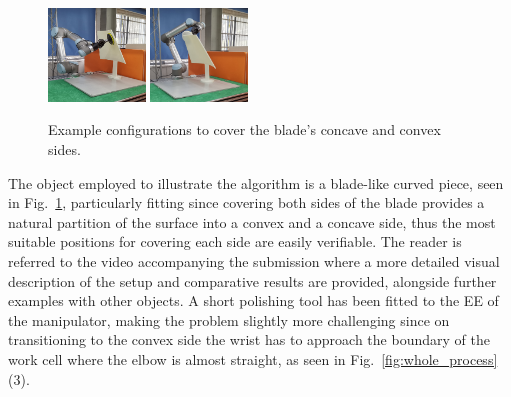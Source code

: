 \documentclass[letterpaper, 10pt, conference]{ieeeconf}
\begin{document}
\begin{figure}[t]
\centering
\includegraphics[width = 0.23\textwidth]{figures/real_world/concave_blade_2}
\includegraphics[width = 0.23\textwidth]{figures/real_world/convex_blade_2}
\caption{Example configurations to cover the blade's concave and convex sides. }
\label{fig:real_world}
\vspace{-0.5cm}
\end{figure}


The object employed to illustrate the algorithm is a blade-like curved piece, seen in Fig.~\ref{fig:real_world}, particularly fitting since covering both sides of the blade provides a natural partition of the surface into a convex and a concave side, thus the most suitable positions for covering each side are easily verifiable. 
The reader is referred to the video accompanying the submission where a more detailed visual description of the setup and comparative results are provided, alongside further examples with other objects. 
A short polishing tool has been fitted to the EE of the manipulator, making the problem slightly more challenging since on transitioning to the convex side the wrist has to approach the boundary of the work cell where the elbow is almost straight, as seen in Fig.~\ref{fig:whole_process} (3).
\end{document}
